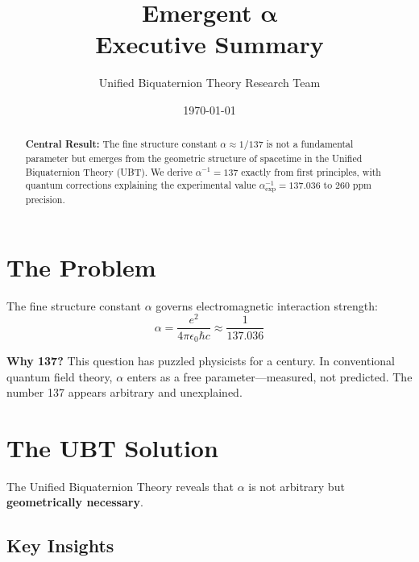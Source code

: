 \documentclass[12pt, a4paper]{article}
\title{\textbf{\Huge Emergent $\boldsymbol{\alpha}$}\\[0.5em]
\Large Executive Summary}
\author{Unified Biquaternion Theory Research Team}
\date{\today}
\begin{document}
\maketitle

\begin{abstract}
\noindent\textcolor{ubtblue}{\textbf{Central Result:}} The fine structure constant $\alpha \approx 1/137$ is not a fundamental parameter but emerges from the geometric structure of spacetime in the Unified Biquaternion Theory (UBT). We derive $\alpha^{-1} = 137$ exactly from first principles, with quantum corrections explaining the experimental value $\alpha_{\text{exp}}^{-1} = 137.036$ to 260 ppm precision.
\end{abstract}

\section{The Problem}

The fine structure constant $\alpha$ governs electromagnetic interaction strength:
\begin{equation}
\alpha = \frac{e^2}{4\pi\epsilon_0\hbar c} \approx \frac{1}{137.036}
\end{equation}

\textbf{Why 137?} This question has puzzled physicists for a century. In conventional quantum field theory, $\alpha$ enters as a free parameter—measured, not predicted. The number 137 appears arbitrary and unexplained.

\section{The UBT Solution}

The Unified Biquaternion Theory reveals that $\alpha$ is not arbitrary but \textbf{geometrically necessary}.

\subsection{Key Insights}
\end{document}
